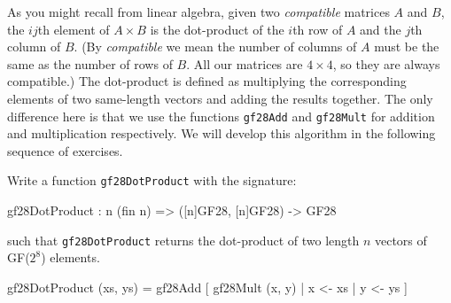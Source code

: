 As you might recall from linear algebra, given two \emph{compatible}
matrices $A$ and $B$, the $ij$th element of $A\times B$ is the
dot-product of the $i$th row of $A$ and the $j$th column of $B$.
(By \emph{compatible} we mean the number of columns of $A$ must be the
same as the number of rows of $B$.  All our matrices are $4\times 4$,
so they are always compatible.)  The dot-product is defined as
multiplying the corresponding elements of two same-length vectors and
adding the results together. The only difference here is that we use
the functions {\tt gf28Add} and {\tt gf28Mult} for addition and
multiplication respectively. We will develop this algorithm in the
following sequence of exercises.

\begin{Exercise}\label{ex:aesmc:0}
Write a function {\tt gf28DotProduct} with the signature:
\begin{code}
  gf28DotProduct : {n} (fin n) => ([n]GF28, [n]GF28) -> GF28
\end{code}
such that {\tt gf28DotProduct} returns the dot-product of two length $n$ vectors of GF($2^8$) elements.
\end{Exercise}
\begin{Answer}
\begin{code}
  gf28DotProduct (xs, ys) = gf28Add [ gf28Mult (x, y) | x <- xs
                                                      | y <- ys
                                    ]
\end{code}
\end{Answer}



